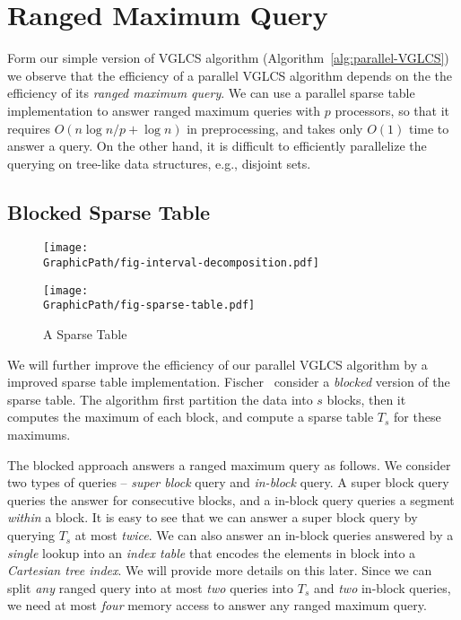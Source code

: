 \section{Ranged Maximum Query} \label{sec:parallelRMQ}


Form our simple version of VGLCS algorithm
(Algorithm~\ref{alg:parallel-VGLCS}) we observe that the efficiency of
a parallel VGLCS algorithm depends on the the efficiency of its {\em
  ranged maximum query}.  We can use a parallel sparse table
implementation to answer ranged maximum queries with $p$ processors,
so that it requires $O(n \log n / p + \log n)$ in preprocessing, and
takes only $O(1)$ time to answer a query.  On the other hand, it is
difficult to efficiently parallelize the querying on tree-like data
structures, e.g., disjoint sets.

\subsection{Blocked Sparse Table}

\begin{figure}[!thb]   \label{fig:interval-decomposition}
  \centering 
    \texttt{[image: \\GraphicPath/fig-interval-decomposition.pdf]}

    \texttt{[image: \\GraphicPath/fig-sparse-table.pdf]}
  \caption{A Sparse Table}
\end{figure}

We will further improve the efficiency of our parallel VGLCS algorithm
by a improved sparse table implementation.
Fischer~\cite{Fischer2006TheoreticalAP} consider a {\em blocked}
version of the sparse table.  The algorithm first partition the data
into $s$ blocks, then it computes the maximum of each block, and
compute a sparse table $T_s$ for these maximums.

The blocked approach answers a ranged maximum query as follows.  We
consider two types of queries -- {\em super block} query and {\em
  in-block} query.  A super block query queries the answer for
consecutive blocks, and a in-block query queries a segment {\em
  within} a block.  It is easy to see that we can answer a super block
query by querying $T_s$ at most {\em twice}.  We can also answer an
in-block queries answered by a {\em single} lookup into an {\em index
  table} that encodes the elements in block into a {\em Cartesian tree
  index}.  We will provide more details on this later.  Since we can
split {\em any} ranged query into at most {\em two} queries into $T_s$
and {\em two} in-block queries, we need at most {\em four} memory
access to answer any ranged maximum query.


